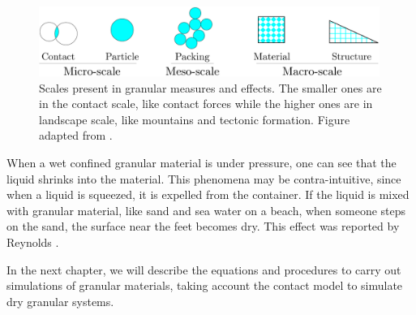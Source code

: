\begin{figure}
    \centering
    \includegraphics[width=0.99\textwidth]{04-figuras/Granular_Scales.png}
    \caption[Granular scales.]{Scales present in granular measures and effects. The smaller ones are in the contact scale, like contact forces while the higher ones are in landscape scale, like mountains and tectonic formation. Figure adapted from \cite{Modeling_Granular_Materials}.}
    \label{fig:granular_scales}
\end{figure}


    When a wet confined granular material is under pressure, one can see that the liquid shrinks into the material. This phenomena may be contra-intuitive, since when a liquid is squeezed, it is expelled from the container. If the liquid is mixed with granular material, like sand and sea water on a beach, when someone steps on the sand, the surface near the feet becomes dry. This effect was reported by Reynolds \cite{On_the_dilatancy}.

    In the next chapter, we will describe the equations and procedures to carry out simulations of granular materials, taking account the contact model to simulate dry granular systems.
